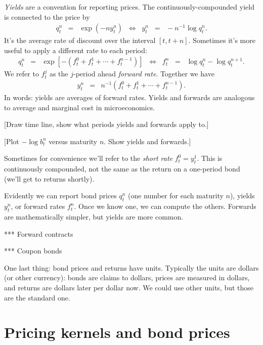 \documentclass[11pt]{article}
\begin{document}
{\it Yields\/} are a convention for reporting prices.
The continuously-compounded yield is connected to the price by
\begin{eqnarray}
    q^n_t &=&  \exp(- n y^n_t)
        \;\;\Leftrightarrow\;\;
        y^n_t \;\;=\;\; - n^{-1} \log q^n_t .
        \label{eq:yields}
\end{eqnarray}
It's the average rate of discount over the interval $[t, t+n]$.
Sometimes it's more useful to apply a different
rate to each period:
\begin{eqnarray}
    q^n_t &=&  \exp[- (f^0_t + f^1_t + \cdots + f^{n-1}_t)]
        \;\;\Leftrightarrow\;\;
        f^n_t \;\;=\;\;  \log q^n_t - \log q^{n+1}_t .
        \label{eq:forwards}
\end{eqnarray}
We refer to $f^j_t$ as the $j$-period ahead {\it forward rate\/}.
Together we have
\begin{eqnarray*}
    y^n_t &=&  n^{-1} \left( f^0_t + f^1_t + \cdots + f^{n-1}_t \right).
\end{eqnarray*}
In words:  yields are averages of forward rates.
Yields and forwards are analogous to average and marginal cost in microeconomics.

[Draw time line, show what periods yields and forwards apply to.]

[Plot $-\log b^n_t$ versus maturity $n$.  Show yields and forwards.]

Sometimes for convenience we'll refer to the {\it short rate\/}
$f^0_t = y^1_t$.
This is continuously compounded, not the same as the return on
a one-period bond (we'll get to returns shortly).

Evidently we can report bond prices $q^n_t$ (one number for each maturity $n$),
yields $y^n_t$, or forward rates $f^n_t$.
Once we know one, we can compute the others.
Forwards are mathematically simpler, but yields are more common.

*** Forward contracts

*** Coupon bonds


One last thing:  bond prices and returns have units.
Typically the units are dollars (or other currency):
bonds are claims to dollars, prices are measured in dollars,
and returns are dollars later per dollar now.
We could use other units, but those are the standard one.


\section{Pricing kernels and bond prices}
\end{document}
